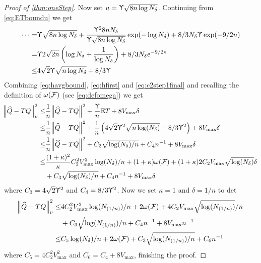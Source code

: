 \begin{proof}[Proof of \cref{thm:oneStep}]
  Now set $u = \Upupsilon \sqrt{8 n \log N_\delta}$.
  Continuing from \cref{eq:ETboundu} we get
  \begin{align}
    \dots = & \Upupsilon \sqrt{8 n \log N_\delta}
    + \frac{\Upupsilon^2 8 n N_\delta}{\Upupsilon \sqrt{8 n \log N_\delta}}
    \exp(-\log N_\delta) + 8/3 N_\delta \Upupsilon \exp(-9/2 n)
    \\ = & \Upupsilon 2 \sqrt{2n} \left( \log N_\delta + \frac{1}{\log N_\delta} \right)
    + 8/3 N_\delta e^{-9/2 n}
    \\ \leq & 4 \sqrt{2} \Upupsilon \sqrt{n \log N_\delta} + 8/3 \Upupsilon
    \label{eq:ETbound}
  \end{align}
  Combining \cref{eq:havgbound}, \cref{eq:hfirst} and \cref{eq:c2step1final}
  and recalling the definition of $\omega(\mathcal{F})$ (see \cref{eq:defomega})
  we get
  \begin{align}
    \norm{\widehat{Q} - TQ}^2_\nu
    \leq & \frac{1}{n} \norm{\widehat{Q} - TQ}^2 + \frac{\Upupsilon}{n} \mathbb{E} T
    + 8 V_{\max} \delta
    \\ \leq & \frac{1}{n} \norm{\widehat{Q} - TQ}^2 + \frac{1}{n}
    \left(4\sqrt{2} \Upupsilon^2 \sqrt{n \log(N_\delta)} + 8/3 \Upupsilon^2 \right)
    + 8 V_{\max} \delta
    \\ \leq & \frac{1}{n} \norm{\widehat{Q} - TQ}^2
    + C_3 \sqrt{\log(N_\delta)/n} + C_4 n^{-1}
    + 8 V_{\max} \delta
    \\ \leq & \frac{(1 + \kappa)^2}{\kappa} C_2^2 V_{\max}^2 \log(N_\delta)/n
    + (1 + \kappa) \omega(\mathcal{F}) + (1 + \kappa) 2 C_2 V_{\max}
    \sqrt{\log(N_\delta)} \delta
    \notag
    \\ & + C_3 \sqrt{\log(N_\delta)/n} + C_4 n^{-1}
    + 8 V_{\max} \delta
   \label{eq:C2final}
  \end{align}
  where $C_3 = 4\sqrt{2} \Upupsilon^2$ and $C_4 = 8/3 \Upupsilon^2$.
  Now we set $\kappa = 1$ and $\delta = 1/n$ to det
  \begin{align}
    \norm{\widehat{Q} - TQ}_\nu^2
    \leq & 4 C_2^2 V_{\max}^2 \log(N_{(1/n)})/n
    + 2 \omega(\mathcal{F}) + 4 C_2 V_{\max}
    \sqrt{\log(N_{(1/n)})}/n
    \notag
    \\ & + C_3 \sqrt{\log(N_{(1/n)})/n} + C_4 n^{-1}
    + 8 V_{\max} n^{-1} 
    \\
    \leq & C_5 \log(N_\delta)/n
    + 2 \omega(\mathcal{F})
    + C_3 \sqrt{\log(N_{(1/n)})/n} + C_6 n^{-1}
  \end{align}
  where $C_5 = 4 C_2^2 V_{\max}^2$ and $C_6 = C_4 + 8 V_{\max}$,
  finishing the proof.
\end{proof}



